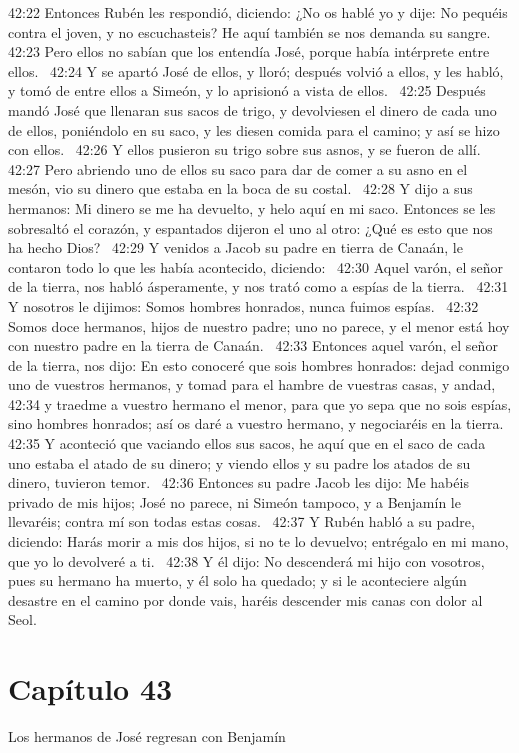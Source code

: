 42:22 Entonces Rubén les respondió, diciendo: ¿No os hablé yo y dije: No pequéis contra el joven, y no escuchasteis? He aquí también se nos demanda su sangre.  
42:23 Pero ellos no sabían que los entendía José, porque había intérprete entre ellos.  
42:24 Y se apartó José de ellos, y lloró; después volvió a ellos, y les habló, y tomó de entre ellos a Simeón, y lo aprisionó a vista de ellos.  
42:25 Después mandó José que llenaran sus sacos de trigo, y devolviesen el dinero de cada uno de ellos, poniéndolo en su saco, y les diesen comida para el camino; y así se hizo con ellos.  
42:26 Y ellos pusieron su trigo sobre sus asnos, y se fueron de allí.  
42:27 Pero abriendo uno de ellos su saco para dar de comer a su asno en el mesón, vio su dinero que estaba en la boca de su costal.  
42:28 Y dijo a sus hermanos: Mi dinero se me ha devuelto, y helo aquí en mi saco. Entonces se les sobresaltó el corazón, y espantados dijeron el uno al otro: ¿Qué es esto que nos ha hecho Dios?  
42:29 Y venidos a Jacob su padre en tierra de Canaán, le contaron todo lo que les había acontecido, diciendo:  
42:30 Aquel varón, el señor de la tierra, nos habló ásperamente, y nos trató como a espías de la tierra.  
42:31 Y nosotros le dijimos: Somos hombres honrados, nunca fuimos espías.  
42:32 Somos doce hermanos, hijos de nuestro padre; uno no parece, y el menor está hoy con nuestro padre en la tierra de Canaán.  
42:33 Entonces aquel varón, el señor de la tierra, nos dijo: En esto conoceré que sois hombres honrados: dejad conmigo uno de vuestros hermanos, y tomad para el hambre de vuestras casas, y andad,  
42:34 y traedme a vuestro hermano el menor, para que yo sepa que no sois espías, sino hombres honrados; así os daré a vuestro hermano, y negociaréis en la tierra.  
42:35 Y aconteció que vaciando ellos sus sacos, he aquí que en el saco de cada uno estaba el atado de su dinero; y viendo ellos y su padre los atados de su dinero, tuvieron temor.  
42:36 Entonces su padre Jacob les dijo: Me habéis privado de mis hijos; José no parece, ni Simeón tampoco, y a Benjamín le llevaréis; contra mí son todas estas cosas.  
42:37 Y Rubén habló a su padre, diciendo: Harás morir a mis dos hijos, si no te lo devuelvo; entrégalo en mi mano, que yo lo devolveré a ti.  
42:38 Y él dijo: No descenderá mi hijo con vosotros, pues su hermano ha muerto, y él solo ha quedado; y si le aconteciere algún desastre en el camino por donde vais, haréis descender mis canas con dolor al Seol.  
\section*{Capítulo 43}
Los hermanos de José regresan con Benjamín  

